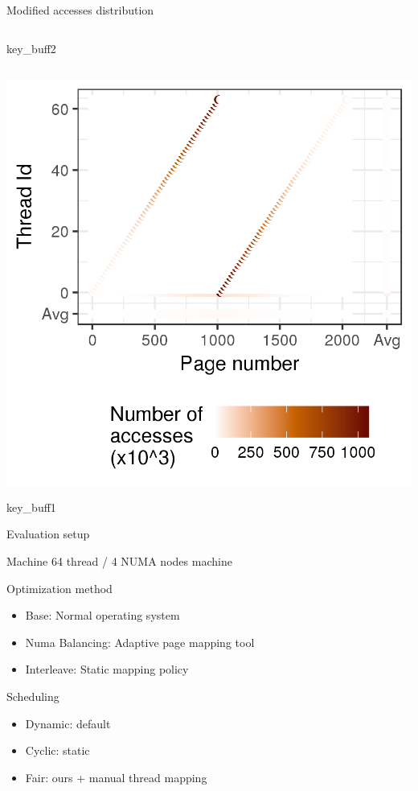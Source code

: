 \documentclass[xcolor={usenames,dvipsnames},hyperref={pdfusetitle}]{beamer}
\begin{document}
\begin{frame}{Modified accesses distribution}
{\begin{columns}
\begin{column}{.45\linewidth}
                \begin{block}{}
                    \centering
                    key\_buff2
                \end{block}
            \end{column}
        \end{columns}
    }{
        \centering
        \includegraphics[width=.6\linewidth]{tabarnac/is_b_kb1_dist_m.png}
        \begin{block}{}
            \centering
            key\_buff1
        \end{block}
    }
    \pause
\end{frame}

\begin{frame}{Evaluation setup}
    \begin{block}{Machine}
        64 thread / 4 NUMA nodes machine
    \end{block}
    \pause
    \begin{block}{Optimization method}
        \begin{itemize}
            \item Base: Normal operating system
            \item Numa Balancing: Adaptive page mapping tool
            \item Interleave: Static mapping policy
        \end{itemize}
    \end{block}
    \pause
    \begin{exampleblock}{Scheduling}
        \begin{itemize}
            \item Dynamic: default
            \item Cyclic: static
            \item Fair: ours + manual thread mapping
        \end{itemize}
    \end{exampleblock}
\end{frame}
\end{document}
